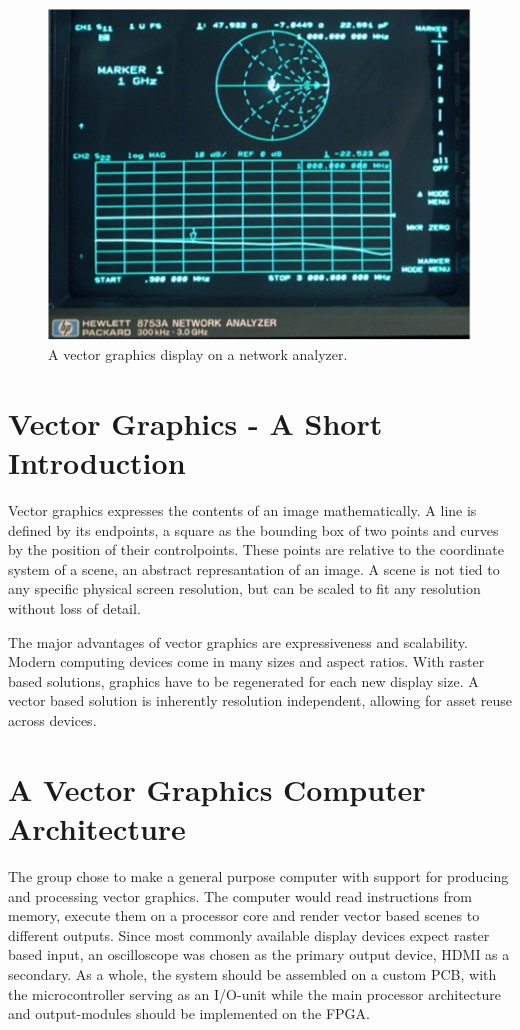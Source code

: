 \begin{figure}[h!]
    \centering
    \includegraphics[width=0.8\linewidth]{images/network-analyzer-vector-graphics-display.png}
    \caption{A vector graphics display on a network analyzer\cite{assignment-text}.}
    \label{fig:vector-display-network-analyzer}
\end{figure}

\section{Vector Graphics - A Short Introduction}

Vector graphics expresses the contents of an image mathematically.
A line is defined by its endpoints, a square as the bounding box of two points and curves by the position of their controlpoints.
These points are relative to the coordinate system of a scene, an abstract represantation of an image.
A scene is not tied to any specific physical screen resolution, but can be scaled to fit any resolution without loss of detail.

The major advantages of vector graphics are expressiveness and scalability.
Modern computing devices come in many sizes and aspect ratios.
With raster based solutions, graphics have to be regenerated for each new display size.
A vector based solution is inherently resolution independent, allowing for asset reuse across devices.

\section{A Vector Graphics Computer Architecture}

The group chose to make a general purpose computer with support for producing and processing vector graphics.
The computer would read instructions from memory, execute them on a processor core and render vector based scenes to different outputs.
Since most commonly available display devices expect raster based input, an oscilloscope was chosen as the primary output device, HDMI as a secondary.
As a whole, the system should be assembled on a custom PCB, with the microcontroller serving as an I/O-unit while the main processor architecture and output-modules should be implemented on the FPGA.

